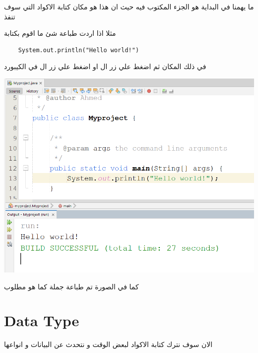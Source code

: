  \begin{AR}
    ما يهمنا في البداية هو الجزء المكتوب فيه  حيث ان هذا هو مكان كتابة الاكواد التي سوف تنفذ

    مثلا اذا اردت طباعة شئ ما اقوم بكتابة 
  \end{AR}
  \begin{verbatim}
    System.out.println("Hello world!")
  \end{verbatim}
  \begin{AR}
    في ذلك المكان ثم اضغط علي زر ال او اضغط علي زر ال في الكيبورد 
  \end{AR}
  \begin{center}
    \includegraphics[scale=.5]{output1.png}  
  \end{center}
  \begin{AR}
    كما في الصورة تم طباعة جملة  كما هو مطلوب
  \end{AR}
\newpage
  \section{Data Type}
  \begin{AR}
    الان سوف نترك كتابة الاكواد لبعض الوقت و نتحدث عن البيانات و انواعها
  \end{AR}
  

